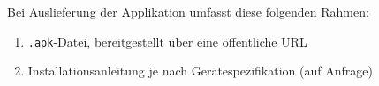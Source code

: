Bei Auslieferung der Applikation umfasst diese folgenden Rahmen:

\begin{enumerate}
    \item \texttt{.apk}-Datei, bereitgestellt über eine öffentliche URL
    \item Installationsanleitung je nach Gerätespezifikation (auf Anfrage)
\end{enumerate}
